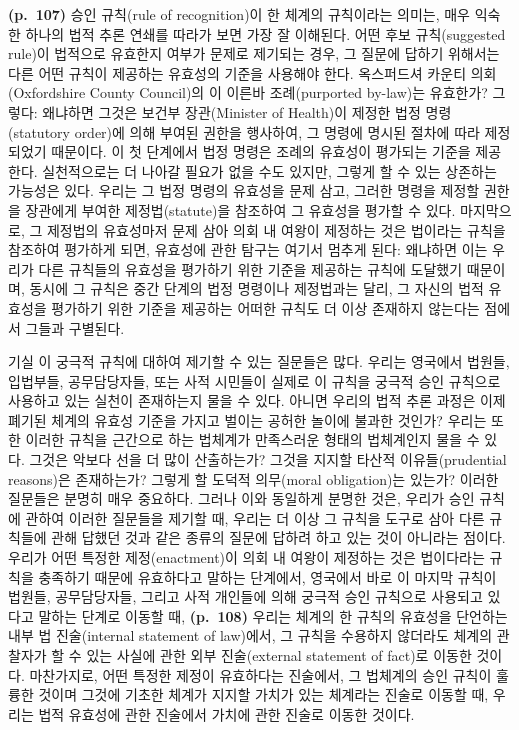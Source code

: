 \textbf{(p.~107)} 승인 규칙(rule of recognition)이 한 체계의
 규칙이라는 의미는, 매우 익숙한 하나의 법적 추론
연쇄를 따라가 보면 가장 잘 이해된다. 어떤 후보 규칙(suggested rule)이
법적으로 유효한지 여부가 문제로 제기되는 경우, 그 질문에 답하기 위해서는
다른 어떤 규칙이 제공하는 유효성의 기준을 사용해야 한다. 옥스퍼드셔
카운티 의회(Oxfordshire County Council)의 이 이른바 조례(purported
by-law)는 유효한가? 그렇다: 왜냐하면 그것은 보건부 장관(Minister of
Health)이 제정한 법정 명령(statutory order)에 의해 부여된 권한을
행사하여, 그 명령에 명시된 절차에 따라 제정되었기 때문이다. 이 첫
단계에서 법정 명령은 조례의 유효성이 평가되는 기준을 제공한다.
실천적으로는 더 나아갈 필요가 없을 수도 있지만, 그렇게 할 수 있는
상존하는 가능성은 있다. 우리는 그 법정 명령의 유효성을 문제 삼고, 그러한
명령을 제정할 권한을 장관에게 부여한 제정법(statute)을 참조하여 그
유효성을 평가할 수 있다. 마지막으로, 그 제정법의 유효성마저 문제 삼아
의회 내 여왕이 제정하는 것은 법이라는 규칙을 참조하여 평가하게 되면,
유효성에 관한 탐구는 여기서 멈추게 된다: 왜냐하면 이는 우리가 다른
규칙들의 유효성을 평가하기 위한 기준을 제공하는 규칙에 도달했기
때문이며, 동시에 그 규칙은 중간 단계의 법정 명령이나 제정법과는 달리, 그
자신의 법적 유효성을 평가하기 위한 기준을 제공하는 어떠한 규칙도 더 이상
존재하지 않는다는 점에서 그들과 구별된다.

기실 이 궁극적 규칙에 대하여 제기할 수 있는 질문들은 많다. 우리는
영국에서 법원들, 입법부들, 공무담당자들, 또는 사적 시민들이 실제로 이
규칙을 궁극적 승인 규칙으로 사용하고 있는 실천이 존재하는지 물을 수
있다. 아니면 우리의 법적 추론 과정은 이제 폐기된 체계의 유효성 기준을
가지고 벌이는 공허한 놀이에 불과한 것인가? 우리는 또한 이러한 규칙을
근간으로 하는 법체계가 만족스러운 형태의 법체계인지 물을 수 있다. 그것은
악보다 선을 더 많이 산출하는가? 그것을 지지할 타산적 이유들(prudential
reasons)은 존재하는가? 그렇게 할 도덕적 의무(moral obligation)는 있는가?
이러한 질문들은 분명히 매우 중요하다. 그러나 이와 동일하게 분명한 것은,
우리가 승인 규칙에 관하여 이러한 질문들을 제기할 때, 우리는 더 이상 그
규칙을 도구로 삼아 다른 규칙들에 관해 답했던 것과 같은 종류의 질문에
답하려 하고 있는 것이 아니라는 점이다. 우리가 어떤 특정한
제정(enactment)이 의회 내 여왕이 제정하는 것은 법이다라는 규칙을
충족하기 때문에 유효하다고 말하는 단계에서, 영국에서 바로 이 마지막
규칙이 법원들, 공무담당자들, 그리고 사적 개인들에 의해 궁극적 승인
규칙으로 사용되고 있다고 말하는 단계로 이동할 때, \textbf{(p.~108)}
우리는 체계의 한 규칙의 유효성을 단언하는 내부 법 진술(internal
statement of law)에서, 그 규칙을 수용하지 않더라도 체계의 관찰자가 할 수
있는 사실에 관한 외부 진술(external statement of fact)로 이동한 것이다.
마찬가지로, 어떤 특정한 제정이 유효하다는 진술에서, 그 법체계의 승인
규칙이 훌륭한 것이며 그것에 기초한 체계가 지지할 가치가 있는 체계라는
진술로 이동할 때, 우리는 법적 유효성에 관한 진술에서 가치에 관한 진술로
이동한 것이다.

